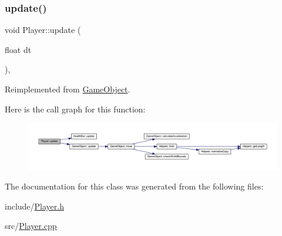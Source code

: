 \subsubsection{\texorpdfstring{update()}{update()}}
{\footnotesize\ttfamily void Player\+::update (\begin{DoxyParamCaption}\item[{float}]{dt }\end{DoxyParamCaption})\hspace{0.3cm}{\ttfamily [override]}, {\ttfamily [virtual]}}



Reimplemented from \hyperlink{class_game_object_a2fece397b6343682d639f8943f124d0e}{Game\+Object}.

Here is the call graph for this function\+:
\nopagebreak
\begin{figure}[H]
\begin{center}
\leavevmode
\includegraphics[width=350pt]{class_player_abe2902b7decc38472183a08977eeb57f_cgraph}
\end{center}
\end{figure}


The documentation for this class was generated from the following files\+:\begin{DoxyCompactItemize}
\item 
include/\hyperlink{_player_8h}{Player.\+h}\item 
src/\hyperlink{_player_8cpp}{Player.\+cpp}\end{DoxyCompactItemize}
